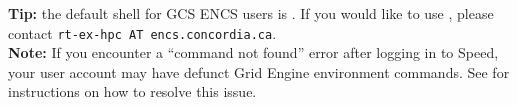 
\noindent\textbf{Tip:} the default shell for GCS ENCS users is .
If you would like to use , please contact \texttt{rt-ex-hpc AT encs.concordia.ca}.\\





%

\noindent\textbf{Note:} If you encounter a ``command not found'' error after logging in to Speed, 
your user account may have defunct Grid Engine environment commands. 
See  for instructions on how to resolve this issue.
